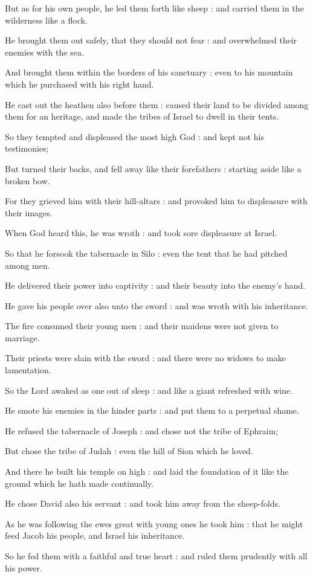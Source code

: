But as for his own people, he led them forth like sheep : and carried them in the wilderness like a flock.\par
{}He brought them out safely, that they should not fear : and overwhelmed their enemies with the sea.\par
{}And brought them within the borders of his sanctuary : even to his mountain which he purchased with his right hand.\par
{}He cast out the heathen also before them : caused their land to be divided among them for an heritage, and made the tribes of Israel to dwell in their tents.\par
{}So they tempted and displeased the most high God : and kept not his testimonies;\par
{}But turned their backs, and fell away like their forefathers : starting aside like a broken bow.\par
{}For they grieved him with their hill-altars : and provoked him to displeasure with their images.\par
{}When God heard this, he was wroth : and took sore displeasure at Israel.\par
{}So that he forsook the tabernacle in Silo : even the tent that he had pitched among men.\par
{}He delivered their power into captivity : and their beauty into the enemy's hand.\par
{}He gave his people over also unto the sword : and was wroth with his inheritance.\par
{}The fire consumed their young men : and their maidens were not given to marriage.\par
{}Their priests were slain with the sword : and there were no widows to make lamentation.\par
{}So the Lord awaked as one out of sleep : and like a giant refreshed with wine.\par
{}He smote his enemies in the hinder parts : and put them to a perpetual shame.\par
{}He refused the tabernacle of Joseph : and chose not the tribe of Ephraim;\par
{}But chose the tribe of Judah : even the hill of Sion which he loved.\par
{}And there he built his temple on high : and laid the foundation of it like the ground which he hath made continually.\par
{}He chose David also his servant : and took him away from the sheep-folds.\par
{}As he was following the ewes great with young ones he took him : that he might feed Jacob his people, and Israel his inheritance.\par
{}So he fed them with a faithful and true heart : and ruled them prudently with all his power.\par

